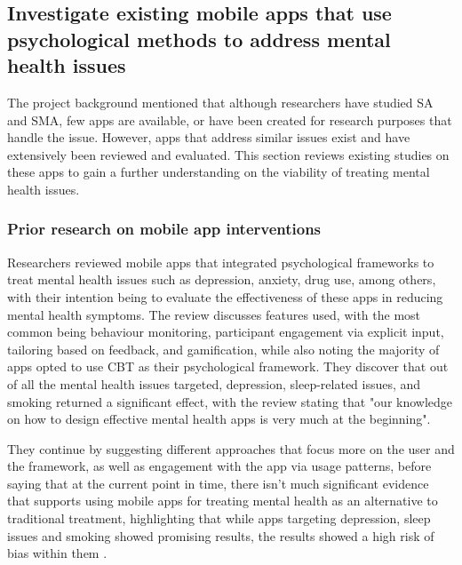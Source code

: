 \documentclass[12pt]{article}
\begin{document}
\subsection{Investigate existing mobile apps that use psychological methods to address mental health issues}
The project background mentioned that although researchers have studied SA and SMA, few apps are available, 
or have been created for research purposes that handle the issue. However, apps that address similar 
issues exist and have extensively been reviewed and evaluated. This section reviews existing
studies on these apps to gain a further understanding on the viability of treating mental health issues.

\subsubsection{Prior research on mobile app interventions}
Researchers \textcite{RefWorks:RefID:87-weisel2019standalone} reviewed mobile apps that integrated
psychological frameworks to treat mental health issues such as depression, anxiety,
drug use, among others, with their intention being to evaluate the 
effectiveness of these apps in reducing mental health symptoms. The review discusses features used, 
with the most common being behaviour monitoring, participant engagement via explicit input, tailoring based on 
feedback, 
and gamification, while also noting the majority of apps opted to use CBT as their psychological framework.
They discover that out of all the mental health issues targeted, depression, sleep-related 
issues, and smoking returned a significant effect, with the review stating that "our knowledge on how to design 
effective mental health apps is very much at the beginning". \newline

They continue by suggesting different approaches that focus more on the user and the framework, as well as 
engagement with the app via usage patterns,
before saying that at the current point in time, there isn't much significant evidence 
that supports using mobile apps for treating mental health as an alternative to traditional treatment, highlighting that
while apps targeting depression, sleep issues and smoking showed promising results, the results showed a high
risk of bias within them \autocite{RefWorks:RefID:87-weisel2019standalone}. \newline
\end{document}
